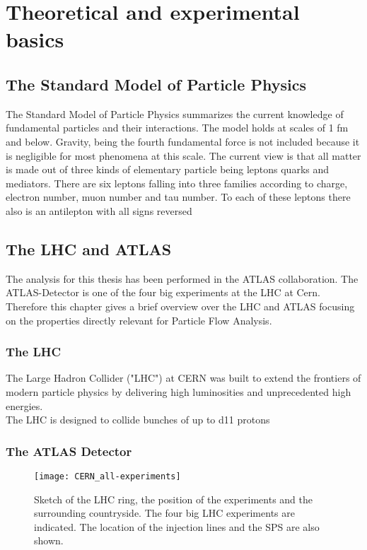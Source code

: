 \chapter{Theoretical and experimental basics}
\label{theory}

\section{The Standard Model of Particle Physics}

The Standard Model of Particle Physics summarizes the current knowledge of fundamental particles and their interactions. The model holds at scales of 1 fm and below. Gravity, being the fourth fundamental force is not included because it is negligible for most phenomena at this scale.
The current view is that all matter is made out of three kinds of elementary particle being leptons quarks and mediators.
There are six leptons falling into three families according to charge, electron number, muon number and tau number. To each of these leptons there also is an antilepton with all signs reversed





\section{The LHC and ATLAS}

The analysis for this thesis has been performed in the ATLAS collaboration. The ATLAS-Detector is one of the four big experiments at the LHC at Cern. Therefore this chapter gives a brief overview over the LHC and ATLAS focusing on the properties directly relevant for Particle Flow Analysis.

\subsection{The LHC}

The Large Hadron Collider ("LHC") at CERN was built to extend the frontiers of modern particle physics by delivering high luminosities and unprecedented high energies.\\
The LHC is designed to collide bunches of up to \num{d11} protons

\subsection{The ATLAS Detector}


\begin{figure}[htbp]
  \centering
  \texttt{[image: CERN\_all-experiments]}
  \caption[Sketch of the LHC ring, the position of the experiments and
  the surrounding countryside.]{Sketch of the LHC ring, the position
    of the experiments and the surrounding countryside. The four big
    LHC experiments are indicated. The location of the injection lines
    and the SPS are also shown.}
  \label{fig:LHC}
\end{figure}

